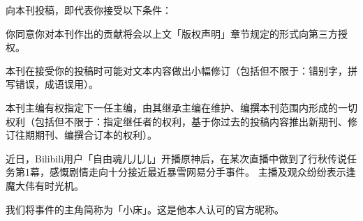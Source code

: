 向本刊投稿，即代表你接受以下条件：

\begin{compactitem}
	\item 你同意你对本刊作出的贡献将会以上文「版权声明」章节规定的形式向第三方授权。
	\item 本刊在接受你的投稿时可能对文本内容做出小幅修订（包括但不限于：错别字，拼写错误，成语误用）。
	\item 本刊主编有权指定下一任主编，由其继承主编在维护、编撰本刊范围内形成的一切权利（包括但不限于：指定继任者的权利，基于你过去的投稿内容推出新期刊、修订往期期刊、编撰合订本的权利）。
\end{compactitem}






\dividearticles
{}

\begin{multicols}{2}

	近日，Bilibili用户「自由魂儿儿儿」开播原神后，在某次直播中做到了行秋传说任务第1幕，感慨剧情走向十分接近最近暴雪网易分手事件。
	主播及观众纷纷表示逢魔大伟有时光机。

	\vskip 10pt
\end{multicols}



\dividearticles
{}

\noindent
我们将事件的主角简称为「小床」。这是他本人认可的官方昵称。


